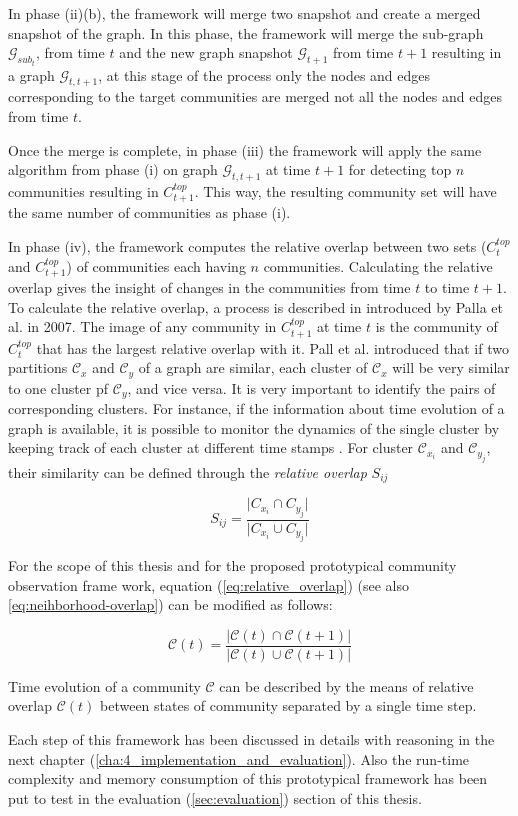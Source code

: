 In phase (ii)(b), the framework will merge two snapshot and create a merged snapshot of the graph. In this phase, the framework will merge the sub-graph $\mathcal{G}_{sub_{t}}$, from time $t$ and the new graph snapshot $\mathcal{G}_{t+1}$ from time $t+1$ resulting in a graph $\mathcal{G}_{t, t+1}$, at this stage of the process only the nodes and edges corresponding to the target communities are merged not all the nodes and edges from time $t$.

Once the merge is complete, in phase (iii) the framework will apply the same algorithm from phase (i) on graph $\mathcal{G}_{t, t+1}$ at  time $t+1$ for detecting top $n$ communities resulting in $C_{t+1}^{top}$. This way, the resulting community set will have the same number of communities as phase (i).

In phase (iv), the framework computes the relative overlap between two sets ($C_t^{top}$ and $C_{t+1}^{top}$) of communities each having $n$ communities. Calculating the relative overlap gives the insight of changes in the communities from time $t$ to time $t+1$. To calculate the relative overlap, a process is described in \cite{ref-23} introduced by Palla et al. in 2007. The image of any community in $C_{t+1}^{top}$ at time $t$ is the community of $C_t^{top}$ that has the largest relative overlap with it. Pall et al. introduced that if two partitions $\mathcal{C}_x$ and $\mathcal{C}_y$ of a graph are similar, each cluster of $\mathcal{C}_x$ will be very similar to one cluster pf $\mathcal{C}_y$, and vice versa. It is very important to identify the pairs of corresponding clusters. For instance, if the information about time evolution of a graph is available, it is possible to monitor the dynamics of the single cluster by keeping track of each cluster at different time stamps \cite{ref-23}. For cluster $\mathcal{C}_{x_{i}}$ and $\mathcal{C}_{y_{j}}$, their similarity can be defined through the \textit{relative overlap} $S_{ij}$

\begin{equation}\label{eq:relative_overlap}
S_{ij} = \dfrac{\lvert C_{x_{i}} \cap C_{y_{j}} \rvert}{\lvert C_{x_{i}} \cup C_{y_{j}} \rvert}
\end{equation} 

For the scope of this thesis and for the proposed prototypical community observation frame work, equation (\ref{eq:relative_overlap}) (see also \ref{eq:neihborhood-overlap}) can be modified as follows:

\begin{equation}
\mathcal{C}(t) = \dfrac{\lvert \mathcal{C}(t) \cap \mathcal{C}(t+1) \rvert}{\lvert \mathcal{C}(t) \cup \mathcal{C}(t+1) \rvert}
\end{equation}

Time evolution of a community $\mathcal{C}$ can be described by the means of relative overlap $\mathcal{C}(t)$ between states of community separated by a single time step.

Each step of this framework has been discussed in details with reasoning in the next chapter (\ref{cha:4_implementation_and_evaluation}). Also the run-time complexity and memory consumption of this prototypical framework has been put to test in the evaluation (\ref{sec:evaluation}) section of this thesis.
